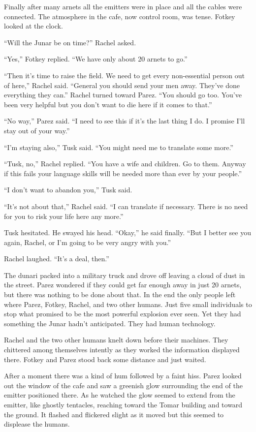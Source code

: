 Finally after many arnets all the emitters were in place and all the cables were connected. The
atmosphere in the cafe, now control room, was tense. Fotkey looked at the clock.

``Will the Junar be on time?'' Rachel asked.

``Yes,'' Fotkey replied. ``We have only about 20 arnets to go.''

``Then it's time to raise the field. We need to get every non-essential person out of here,''
Rachel said. ``General you should send your men away. They've done everything they can.'' Rachel
turned toward Parez. ``You should go too. You've been very helpful but you don't want to die
here if it comes to that.''

``No way,'' Parez said. ``I need to see this if it's the last thing I do. I promise I'll stay
out of your way.''

``I'm staying also,'' Tusk said. ``You might need me to translate some more.''

``Tusk, no,'' Rachel replied. ``You have a wife and children. Go to them. Anyway if this fails
your language skills will be needed more than ever by your people.''

``I don't want to abandon you,'' Tusk said.

``It's not about that,'' Rachel said. ``I can translate if necessary. There is no need for you
to risk your life here any more.''

Tusk hesitated. He swayed his head. ``Okay,'' he said finally. ``But I better see you again,
Rachel, or I'm going to be very angry with you.''

Rachel laughed. ``It's a deal, then.''

The dunari packed into a military truck and drove off leaving a cloud of dust in the street.
Parez wondered if they could get far enough away in just 20 arnets, but there was nothing to be
done about that. In the end the only people left where Parez, Fotkey, Rachel, and two other
humans. Just five small individuals to stop what promised to be the most powerful explosion ever
seen. Yet they had something the Junar hadn't anticipated. They had human technology.

Rachel and the two other humans knelt down before their machines. They chittered among
themselves intently as they worked the information displayed there. Fotkey and Parez stood back
some distance and just waited.

After a moment there was a kind of hum followed by a faint hiss. Parez looked out the window of
the cafe and saw a greenish glow surrounding the end of the emitter positioned there. As he
watched the glow seemed to extend from the emitter, like ghostly tentacles, reaching toward the
Tomar building and toward the ground. It flashed and flickered slight as it moved but this
seemed to displease the humans.

